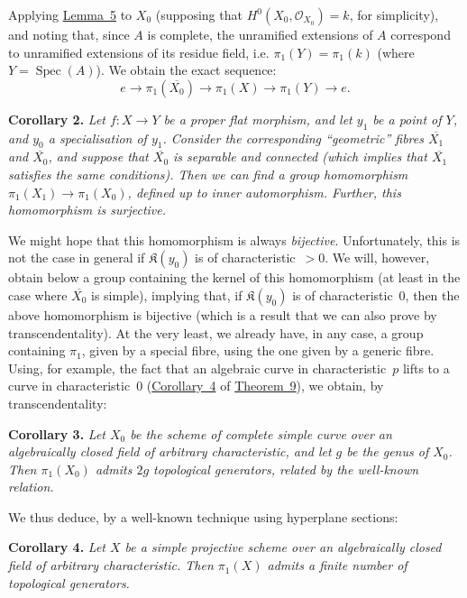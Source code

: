 \documentclass{article}
\newenvironment{itenv}[1]
  {\phantomsection\par\medskip\noindent\textbf{#1.}\itshape}
  {\medskip}
\newcommand{\scr}[1]{{\mathscr{#1}}}
\newcommand{\kres}{\mathfrak{K}}
\DeclareMathOperator{\Spec}{Spec}
\newcommand{\oldpage}[1]{\marginpar{\footnotesize$\Big\vert$ \textit{p.~#1}}}
\begin{document}
Applying \hyperref[lemma5]{Lemma~5} to $X_0$ (supposing that $H^0(X_0,\scr{O}_{X_0})=k$, for simplicity), and noting that, since $A$ is complete, the unramified extensions of $A$ correspond to unramified extensions of its residue field, i.e. $\pi_1(Y)=\pi_1(k)$ (where $Y=\Spec(A)$).
We obtain the exact sequence:
\[
  e \to \pi_1(\overline{X_0}) \to \pi_1(X) \to \pi_1(Y) \to e.
\]

\begin{itenv}{Corollary 2}
\label{theorem12corollary2}
  Let $f\colon X\to Y$ be a proper flat morphism, and let $y_1$ be a point of $Y$, and $y_0$ a specialisation of $y_1$.
  Consider the corresponding ``geometric'' fibres $\overline{X_1}$ and $\overline{X_0}$, and suppose that $\overline{X_0}$ is separable and connected (which implies that $\overline{X_1}$ satisfies the same conditions).
  Then we can find a group homomorphism $\pi_1(X_1)\to\pi_1(X_0)$, defined up to inner automorphism.
  Further, this homomorphism is \emph{surjective}.
\end{itenv}

\oldpage{182-25}
We might hope that this homomorphism is always \emph{bijective}.
Unfortunately, this is not the case in general if $\kres(y_0)$ is of characteristic~$>0$.
We will, however, obtain below a group containing the kernel of this homomorphism (at least in the case where $\overline{X_0}$ is simple), implying that, if $\kres(y_0)$ is of characteristic~$0$, then the above homomorphism is bijective (which is a result that we can also prove by transcendentality).
At the very least, we already have, in any case, a group containing $\pi_1$, given by a special fibre, using the one given by a generic fibre.
Using, for example, the fact that an algebraic curve in characteristic~$p$ lifts to a curve in characteristic~$0$ (\hyperref[theorem9corollary4]{Corollary~4} of \hyperref[theorem9]{Theorem~9}), we obtain, by transcendentality:

\begin{itenv}{Corollary 3}
\label{theorem12corollary3}
  Let $X_0$ be the scheme of complete simple curve over an algebraically closed field of arbitrary characteristic, and let $g$ be the genus of $X_0$.
  Then $\pi_1(X_0)$ admits $2g$ topological generators, related by the well-known relation.
\end{itenv}

We thus deduce, by a well-known technique using hyperplane sections:

\begin{itenv}{Corollary 4}
\label{theorem12corollary4}
  Let $X$ be a simple projective scheme over an algebraically closed field of arbitrary characteristic.
  Then $\pi_1(X)$ admits a finite number of topological generators.
\end{itenv}
\end{document}
